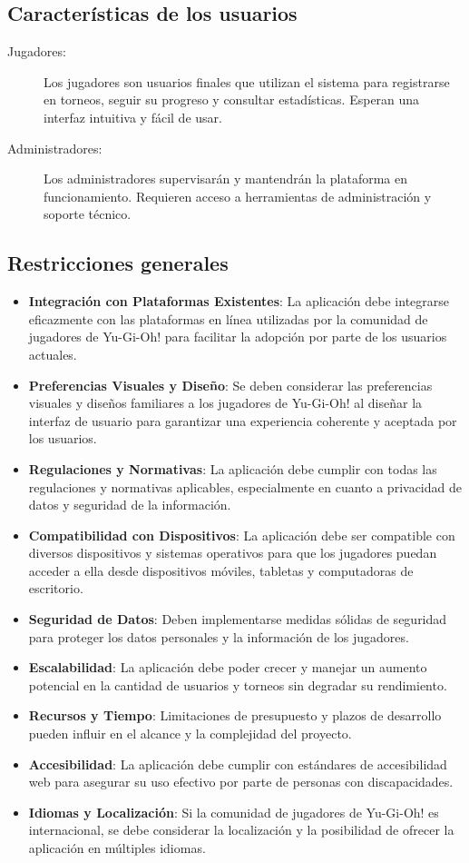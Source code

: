\documentclass[a4paper]{article}
\begin{document}
\subsection*{Caracter\'isticas de los usuarios}
\begin{description}
    \item[Jugadores:] Los jugadores son usuarios finales que utilizan el sistema para registrarse en torneos, seguir su     progreso y consultar estadísticas. Esperan una interfaz intuitiva y fácil de usar.
    \item[Administradores:] Los administradores supervisarán y mantendrán la plataforma en funcionamiento. Requieren acceso a herramientas de administración y soporte técnico.
\end{description}
\subsection*{Restricciones generales}
\begin{itemize}
    \item \textbf{Integración con Plataformas Existentes}: La aplicación debe integrarse eficazmente con las plataformas en línea utilizadas por la comunidad de jugadores de Yu-Gi-Oh! para facilitar la adopción por parte de los usuarios actuales.
    \item \textbf{Preferencias Visuales y Diseño}: Se deben considerar las preferencias visuales y diseños familiares a los jugadores de Yu-Gi-Oh! al diseñar la interfaz de usuario para garantizar una experiencia coherente y aceptada por los usuarios.
    \item \textbf{Regulaciones y Normativas}: La aplicación debe cumplir con todas las regulaciones y normativas aplicables, especialmente en cuanto a privacidad de datos y seguridad de la información.
    \item \textbf{Compatibilidad con Dispositivos}: La aplicación debe ser compatible con diversos dispositivos y sistemas operativos para que los jugadores puedan acceder a ella desde dispositivos móviles, tabletas y computadoras de escritorio.
    \item \textbf{Seguridad de Datos}: Deben implementarse medidas sólidas de seguridad para proteger los datos personales y la información de los jugadores.
    \item \textbf{Escalabilidad}: La aplicación debe poder crecer y manejar un aumento potencial en la cantidad de usuarios y torneos sin degradar su rendimiento.
    \item \textbf{Recursos y Tiempo}: Limitaciones de presupuesto y plazos de desarrollo pueden influir en el alcance y la complejidad del proyecto.
    \item \textbf{Accesibilidad}: La aplicación debe cumplir con estándares de accesibilidad web para asegurar su uso efectivo por parte de personas con discapacidades.
    \item \textbf{Idiomas y Localización}: Si la comunidad de jugadores de Yu-Gi-Oh! es internacional, se debe considerar la localización y la posibilidad de ofrecer la aplicación en múltiples idiomas.
\end{itemize}
\end{document}
